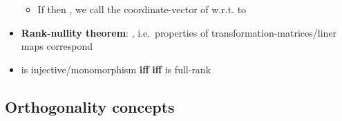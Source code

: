 \begin{itemize}
  \begin{itemize}
  
  \item
    If  then
    , we call  the
    coordinate-vector of  w.r.t. to 
  \end{itemize}
\item
  \textbf{Rank-nullity theorem}:
  ,
  i.e.~properties of transformation-matrices/liner maps correspond
\item
   is injective/monomorphism \textbf{iff}
   \textbf{iff}  is full-rank
\end{itemize}

\subsection*{Orthogonality concepts}

